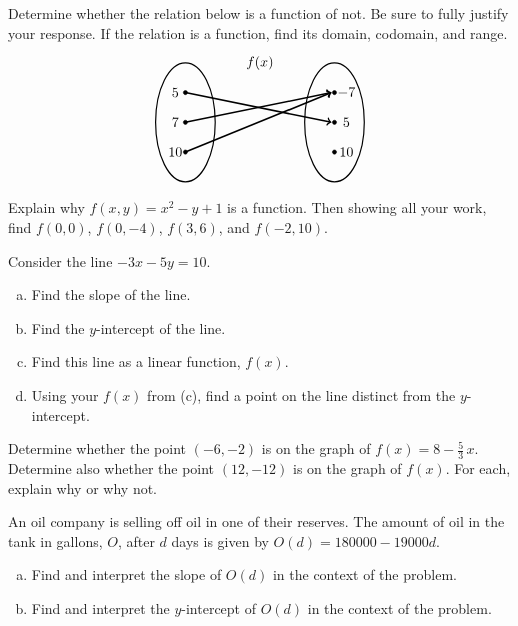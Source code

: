 \documentclass[11pt,letterpaper]{article}
\begin{document}
\prob Determine whether the relation below is a function of not. Be sure to fully justify your response. If the relation is a function, find its domain, codomain, and range. 
	\[
	\begin{tikzpicture}[scale=0.75]
	\node at (2.5,2) {$f(x)$};
	\draw[line width=0.03cm] (0,0) circle (1 and 2);
	\draw[line width=0.03cm] (5,0) circle (1 and 2);
	
	\draw[fill=black] (0,1) circle (0.07);
	\draw[fill=black] (0,0) circle (0.07);
	\draw[fill=black] (0,-1) circle (0.07);
	
	\draw[fill=black] (5,1) circle (0.07);
	\draw[fill=black] (5,0) circle (0.07);
	\draw[fill=black] (5,-1) circle (0.07);
	
	\draw[line width=0.04cm,->] (0,1) -- (4.9,0);
	\draw[line width=0.04cm,->] (0,0) -- (4.9,1);
	\draw[line width=0.04cm,->] (0,-1) -- (4.9,1);
	
	\node at (-0.3,1) {$5\,$};
	\node at (-0.3,0) {$7\,$};
	\node at (-0.3,-1) {$10\,$};
	
	\node at (5.4,1) {$-7$};
	\node at (5.4,0) {$5$};
	\node at (5.4,-1) {$10$};
	\end{tikzpicture}
	\] \pspace


\prob Explain why $f(x, y)= x^2 - y + 1$ is a function. Then showing all your work, find $f(0, 0)$, $f(0, -4)$, $f(3, 6)$, and $f(-2, 10)$. \pspace


\prob Consider the line $-3x - 5y= 10$.
	\begin{enumerate}[(a)]
	\item Find the slope of the line.
	\item Find the $y$-intercept of the line.
	\item Find this line as a linear function, $f(x)$.
	\item Using your $f(x)$ from (c), find a point on the line distinct from the $y$-intercept.
	\end{enumerate} \pspace


\prob Determine whether the point $(-6, -2)$ is on the graph of $f(x)= 8 - \frac{5}{3}\,x$. Determine also whether the point $(12, -12)$ is on the graph of $f(x)$. For each, explain why or why not. \pspace


\prob An oil company is selling off oil in one of their reserves. The amount of oil in the tank in gallons, $O$, after $d$ days is given by $O(d)= 180000 - 19000d$.
	\begin{enumerate}[(a)]
	\item Find and interpret the slope of $O(d)$ in the context of the problem. 
	\item Find and interpret the $y$-intercept of $O(d)$ in the context of the problem. 
	\end{enumerate} \pspace
\end{document}
